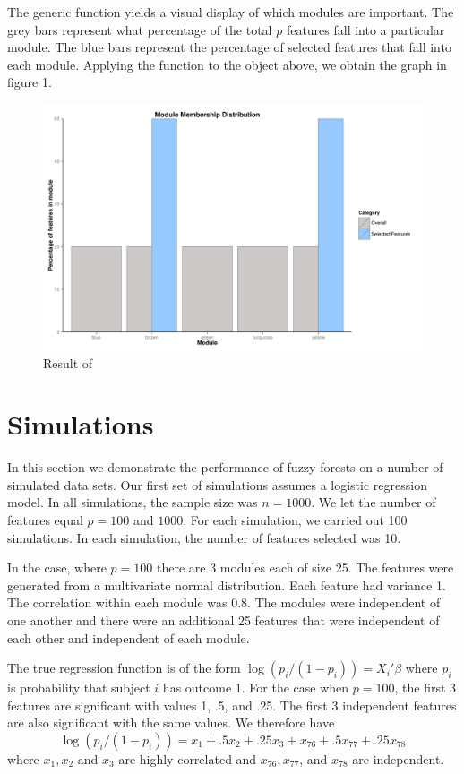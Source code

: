 \documentclass[article,shortnames]{jss}
\begin{document}
The generic function  yields a visual display of which modules are important.  The grey bars
represent what percentage of the total $p$ features fall into a particular module.  The blue bars represent
the percentage of selected features that fall into each module.  Applying the function  to the
object  above, we obtain the graph in figure 1.
\begin{figure}[hc]
\caption{Result of }
\includegraphics{ch3plot}
\end{figure}
\section{Simulations}
In this section we demonstrate the performance of fuzzy forests on a number of simulated data sets.
Our first set of simulations assumes a logistic regression model.  In all simulations, the sample size
was $n=1000$.  We let the number of features equal $p=100$ and $1000$.
For each simulation, we carried out 100 simulations.  In each simulation, the number of features selected
was 10.    

In the case, where $p=100$ there are 3 modules each of size 25.  The features were generated from a multivariate
normal distribution.  Each feature had variance 1.  The correlation within each module was 0.8.  The modules were independent of one 
another and there were an additional 25 features that were independent of each other and independent of each module.  

The true regression function is of the form $\log(p_{i}/(1-p_{i}))=X_{i}'\beta$ where $p_{i}$ is probability that
subject $i$ has outcome 1.   For the case when $p=100$,  the first 3 features are significant with values
1, .5, and .25.  The first 3 independent features are also significant with the same values.  We therefore have
\begin{equation}
\log(p_{i}/(1-p_{i})) = x_{1} + .5x_{2} + .25x_{3} + x_{76} + .5x_{77} + .25x_{78}
\end{equation}
where $x_{1}, x_{2}$ and $x_{3}$ are highly correlated and $ x_{76}, x_{77}$, and $x_{78}$ are independent.
\end{document}
